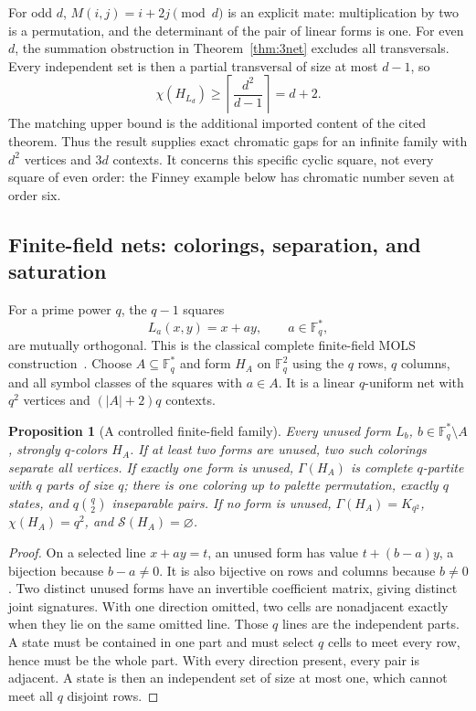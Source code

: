 \documentclass[aps,pra,reprint,superscriptaddress,longbibliography,nofootinbib,floatfix,10pt]{revtex4-2}
\newtheorem{proposition}[theorem]{Proposition}
\theoremstyle{definition}\newtheorem{definition}[theorem]{Definition}
\theoremstyle{remark}\newtheorem{remark}[theorem]{Remark}
\newcommand{\F}{\mathbb F}\newcommand{\Z}{\mathbb Z}\newcommand{\PP}{\mathbb P}
\newcommand{\Sc}{\mathcal S}\newcommand{\Cc}{\mathcal C}
\begin{document}
For odd $d$, $M(i,j)=i+2j\pmod d$ is an explicit mate: multiplication by two is a permutation, and the determinant of the pair of linear forms is one. For even $d$, the summation obstruction in Theorem~\ref{thm:3net} excludes all transversals. Every independent set is then a partial transversal of size at most $d-1$, so
\[
\chi(H_{L_d})\ge\left\lceil\frac{d^2}{d-1}\right\rceil=d+2.
\]
The matching upper bound is the additional imported content of the cited theorem. Thus the result supplies exact chromatic gaps for an infinite family with $d^2$ vertices and $3d$ contexts. It concerns this specific cyclic square, not every square of even order: the Finney example below has chromatic number seven at order six.

\subsection{Finite-field nets: colorings, separation, and saturation}\label{sec:finite-field}

For a prime power $q$, the $q-1$ squares
\begin{equation}\label{eq:field-mols}
L_a(x,y)=x+ay,\qquad a\in\F_q^*,
\end{equation}
are mutually orthogonal. This is the classical complete finite-field MOLS construction~\cite{chowla1960mols}. Choose $A\subseteq\F_q^*$ and form $H_A$ on $\F_q^2$ using the $q$ rows, $q$ columns, and all symbol classes of the squares with $a\in A$. It is a linear $q$-uniform net with $q^2$ vertices and $(|A|+2)q$ contexts.

\begin{proposition}[A controlled finite-field family]\label{prop:field-nets}
Every unused form $L_b$, $b\in\F_q^*\setminus A$, strongly $q$-colors $H_A$. If at least two forms are unused, two such colorings separate all vertices. If exactly one form is unused, $\Gamma(H_A)$ is complete $q$-partite with $q$ parts of size $q$; there is one coloring up to palette permutation, exactly $q$ states, and $q\binom q2$ inseparable pairs. If no form is unused, $\Gamma(H_A)=K_{q^2}$, $\chi(H_A)=q^2$, and $\Sc(H_A)=\varnothing$.
\end{proposition}
\begin{proof}
On a selected line $x+ay=t$, an unused form has value $t+(b-a)y$, a bijection because $b-a\ne0$. It is also bijective on rows and columns because $b\ne0$. Two distinct unused forms have an invertible coefficient matrix, giving distinct joint signatures. With one direction omitted, two cells are nonadjacent exactly when they lie on the same omitted line. Those $q$ lines are the independent parts. A state must be contained in one part and must select $q$ cells to meet every row, hence must be the whole part. With every direction present, every pair is adjacent. A state is then an independent set of size at most one, which cannot meet all $q$ disjoint rows.
\end{proof}
\end{document}
